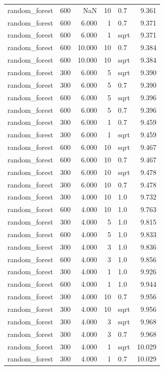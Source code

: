 \begin{tabular}{lrrrlr}
random_forest & 600 & NaN & 10 & 0.7 & 9.361 \\
random_forest & 600 & 6.000 & 1 & 0.7 & 9.371 \\
random_forest & 600 & 6.000 & 1 & sqrt & 9.371 \\
random_forest & 600 & 10.000 & 10 & 0.7 & 9.384 \\
random_forest & 600 & 10.000 & 10 & sqrt & 9.384 \\
random_forest & 300 & 6.000 & 5 & sqrt & 9.390 \\
random_forest & 300 & 6.000 & 5 & 0.7 & 9.390 \\
random_forest & 600 & 6.000 & 5 & sqrt & 9.396 \\
random_forest & 600 & 6.000 & 5 & 0.7 & 9.396 \\
random_forest & 300 & 6.000 & 1 & 0.7 & 9.459 \\
random_forest & 300 & 6.000 & 1 & sqrt & 9.459 \\
random_forest & 600 & 6.000 & 10 & sqrt & 9.467 \\
random_forest & 600 & 6.000 & 10 & 0.7 & 9.467 \\
random_forest & 300 & 6.000 & 10 & sqrt & 9.478 \\
random_forest & 300 & 6.000 & 10 & 0.7 & 9.478 \\
random_forest & 300 & 4.000 & 10 & 1.0 & 9.732 \\
random_forest & 600 & 4.000 & 10 & 1.0 & 9.763 \\
random_forest & 300 & 4.000 & 5 & 1.0 & 9.815 \\
random_forest & 600 & 4.000 & 5 & 1.0 & 9.833 \\
random_forest & 300 & 4.000 & 3 & 1.0 & 9.836 \\
random_forest & 600 & 4.000 & 3 & 1.0 & 9.856 \\
random_forest & 300 & 4.000 & 1 & 1.0 & 9.926 \\
random_forest & 600 & 4.000 & 1 & 1.0 & 9.944 \\
random_forest & 300 & 4.000 & 10 & 0.7 & 9.956 \\
random_forest & 300 & 4.000 & 10 & sqrt & 9.956 \\
random_forest & 300 & 4.000 & 3 & sqrt & 9.968 \\
random_forest & 300 & 4.000 & 3 & 0.7 & 9.968 \\
random_forest & 300 & 4.000 & 1 & sqrt & 10.029 \\
random_forest & 300 & 4.000 & 1 & 0.7 & 10.029 \\

\end{tabular}
